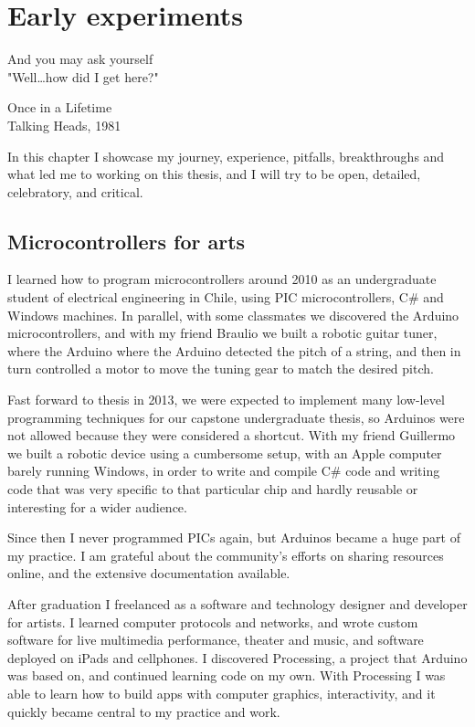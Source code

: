 \chapter{Early experiments}

\epigraph{And you may ask yourself \\ "Well\dots how did I get here?"}{Once in a Lifetime \\ Talking Heads, 1981}

In this chapter I showcase my journey, experience, pitfalls, breakthroughs and what led me to working on this  thesis, and I will try to be open, detailed, celebratory, and critical.

\section{Microcontrollers for arts}

I learned how to program microcontrollers around 2010 as an undergraduate student of electrical engineering in Chile, using PIC microcontrollers, C\# and Windows machines. In parallel, with some classmates we discovered the Arduino microcontrollers, and with my friend Braulio  we built a robotic guitar tuner, where the Arduino where the Arduino detected the pitch of a string, and then in turn controlled a motor to move the tuning gear to match the desired pitch.

Fast forward to thesis in 2013, we were expected to implement many low-level programming techniques for our capstone undergraduate thesis, so Arduinos were not allowed because they were considered a shortcut. With my friend Guillermo we built a robotic device using a cumbersome setup, with an Apple computer barely running Windows, in order to write and compile C\# code and writing code that was very specific to that particular chip and hardly reusable or interesting for a wider audience.

Since then I never programmed PICs again, but Arduinos became a huge part of my practice. I am grateful about the community's efforts on sharing resources online, and the extensive documentation available. 

After graduation I freelanced as a software and technology designer and developer for artists. I learned computer protocols and networks, and wrote custom software for live multimedia performance, theater and music, and software deployed on iPads and cellphones. I discovered Processing, a project that Arduino was based on, and continued learning code on my own. With Processing I was able to learn how to build apps with computer graphics, interactivity, and it quickly became central to my practice and work.


